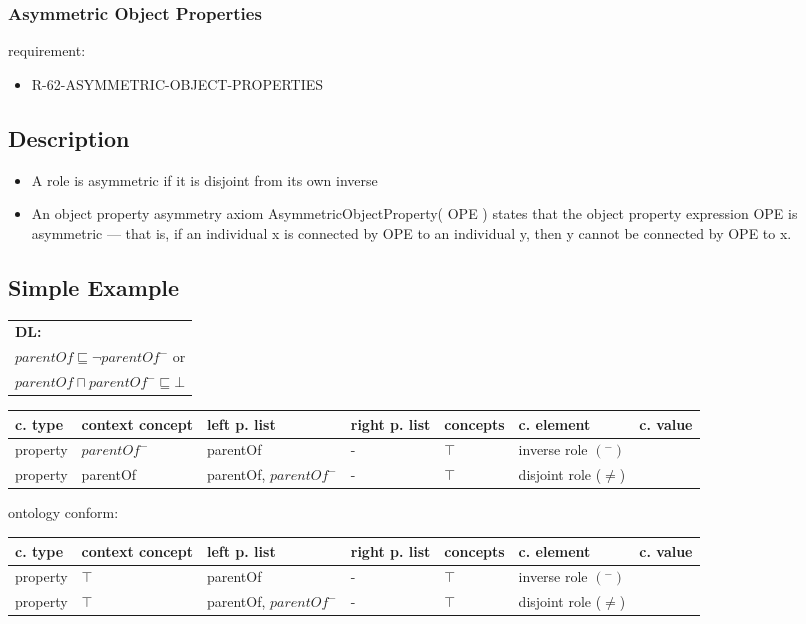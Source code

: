 \documentclass{llncs}
\newenvironment{gcotable}{
  \scriptsize
  \sffamily
  \vspace{0.3cm}
  \begin{tabular}{l|l|l|l|l|l|l}
  \hline
  \textbf{c. type} & \textbf{context concept} & \textbf{left p. list} & \textbf{right p. list} & \textbf{concepts} & \textbf{c. element} & \textbf{c. value} \\
  \hline

}{
  \hline
  \end{tabular}
  \linebreak
}
\newenvironment{DL}{
  \scriptsize
  \sffamily
  \vspace{0.3cm}
  \begin{tabular}{l}
	\textbf{DL:} \\

}{
  \end{tabular}
  \linebreak
}
\begin{document}
\subsubsection{Asymmetric Object Properties}

requirement:

\begin{itemize}
	\item R-62-ASYMMETRIC-OBJECT-PROPERTIES
\end{itemize}

\subsection{Description}

\begin{itemize}
	\item A role is asymmetric if it is disjoint from its own inverse \cite{Kroetzsch2012}
	\item An object property asymmetry axiom AsymmetricObjectProperty( OPE ) states that the object property expression OPE is asymmetric — that is, if an individual x is connected by OPE to an individual y, then y cannot be connected by OPE to x. 
\end{itemize}

\subsection{Simple Example}

\begin{DL}
$parentOf \sqsubseteq \neg parentOf^{-}$ or\\
$parentOf \sqcap parentOf^{-} \sqsubseteq \bot$
\end{DL}



\begin{gcotable}
property & $parentOf^{-}$ & parentOf & - & $\top$ & inverse role $(^{-})$ \\
property & parentOf & parentOf, $parentOf^{-}$ & - & $\top$ & disjoint role ($\ne$) \\
\end{gcotable}

ontology conform:

\begin{gcotable}
property & $\top$ & parentOf & - & $\top$ & inverse role $(^{-})$ \\
property & $\top$ & parentOf, $parentOf^{-}$ & - & $\top$ & disjoint role ($\ne$) \\
\end{gcotable}
\end{document}
